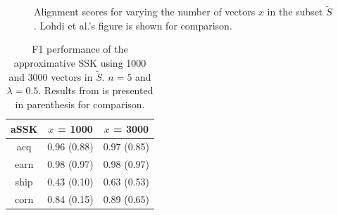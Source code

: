 \begin{figure}
	\centering
	\caption{Alignment scores for varying the number of vectors $ x $ in the subset $ \tilde{S} $. Lohdi et al.'s figure is shown for comparison.\label{fig:alignment}}
\end{figure}

\begin{table}
	\centering
	\begin{tabular}{| c | c | c | }\hline
		aSSK & $ x $ = 1000 & $ x $ = 3000   \\ \hline
		acq & 0.96 (0.88)& 0.97 (0.85)\\ \hline
		earn & 0.98 (0.97) & 0.98  (0.97) \\ \hline
		ship & 0.43 (0.10) & 0.63  (0.53) \\ \hline
		corn & 0.84 (0.15) & 0.89 (0.65) \\ \hline
	\end{tabular} 
	\caption{F1 performance of the approximative SSK using 1000 and 3000 vectors in $ \tilde{S} $. $ n = 5 $ and $ \lambda = 0.5 $. Results from \cite{lodhi} is presented in parenthesis for comparison.\label{tab:alignment}}
\end{table}


